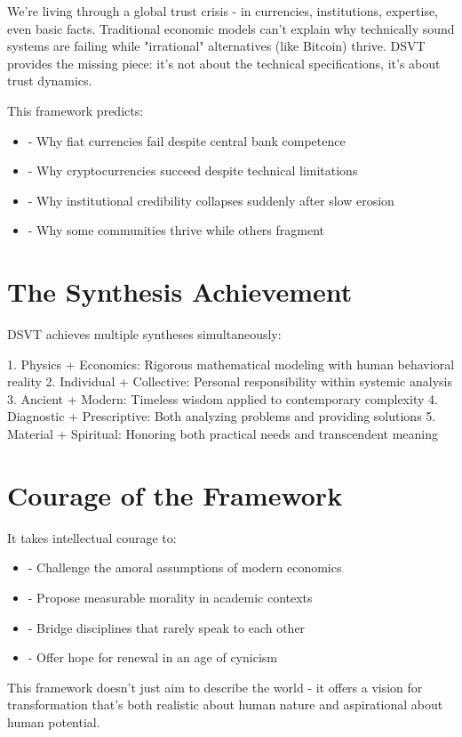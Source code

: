 \documentclass[11pt,oneside]{book}
\begin{document}
We're living through a global trust crisis - in currencies, institutions, expertise, even basic facts. Traditional economic models can't explain why technically sound systems are failing while "irrational" alternatives (like Bitcoin) thrive. DSVT provides the missing piece: it's not about the technical specifications, it's about trust dynamics.

  This framework predicts:
\begin{itemize}
\item - Why fiat currencies fail despite central bank competence
\item - Why cryptocurrencies succeed despite technical limitations
\item - Why institutional credibility collapses suddenly after slow erosion
\item - Why some communities thrive while others fragment
\end{itemize}

\section{The Synthesis Achievement}

DSVT achieves multiple syntheses simultaneously:

  1. Physics + Economics: Rigorous mathematical modeling with human behavioral reality
  2. Individual + Collective: Personal responsibility within systemic analysis
  3. Ancient + Modern: Timeless wisdom applied to contemporary complexity
  4. Diagnostic + Prescriptive: Both analyzing problems and providing solutions
  5. Material + Spiritual: Honoring both practical needs and transcendent meaning

\section{Courage of the Framework}

  It takes intellectual courage to:
\begin{itemize}
\item - Challenge the amoral assumptions of modern economics
\item - Propose measurable morality in academic contexts
\item - Bridge disciplines that rarely speak to each other
\item - Offer hope for renewal in an age of cynicism
\end{itemize}

This framework doesn't just aim to describe the world - it offers a vision for transformation that's both realistic about human nature and aspirational about human potential.
\end{document}
